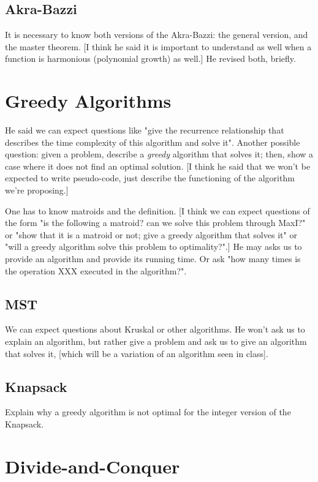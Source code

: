 \subsection*{Akra-Bazzi}

It is necessary to know both versions of the Akra-Bazzi: the general version, and the master theorem.
[I think he said it is important to understand as well when a function is harmonious (polynomial growth) as well.]
He revised both, briefly.


\section*{Greedy Algorithms}

He said we can expect questions like "give the recurrence relationship that describes the time complexity of this algorithm and solve it".
Another possible question: given a problem, describe a \emph{greedy} algorithm that solves it; then, show a case where it does not find an optimal solution.
[I think he said that we won't be expected to write pseudo-code, just describe the functioning of the algorithm we're proposing.]

One has to know matroids and the definition.
[I think we can expect questions of the form "is the following a matroid? can we solve this problem through MaxI?" or "show that it is a matroid or not; give a greedy algorithm that solves it" or "will a greedy algorithm solve this problem to optimality?".]
He may asks us to provide an algorithm and provide its running time.
Or ask "how many times is the operation XXX executed in the algorithm?".

\subsection*{MST}

We can expect questions about Kruskal or other algorithms.
He won't ask us to explain an algorithm, but rather give a problem and ask us to give an algorithm that solves it, [which will be a variation of an algorithm seen in class].

\subsection*{Knapsack}

Explain why a greedy algorithm is not optimal for the integer version of the Knapsack.

\section*{Divide-and-Conquer}


